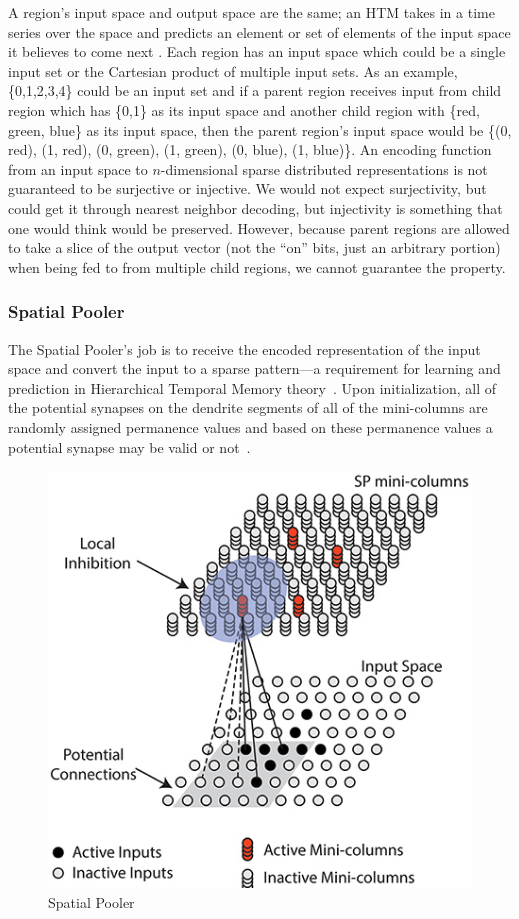 \documentclass[oneside,12pt,openany]{book}
\begin{document}
	A region's input space and output space are the same; an HTM takes in a time series over the space and predicts an element or set of elements of the input space it believes to come next \cite{Purdy}. Each region has an input space which could be a single input set or the Cartesian product of multiple input sets. As an example, \{0,1,2,3,4\} could be an input set and if a parent region receives input from child region which has \{0,1\} as its input space and another child region with \{red, green, blue\} as its input space, then the parent region's input space would be \{(0, red), (1, red), (0, green), (1, green), (0, blue), (1, blue)\}. An encoding function from an input space to $n$-dimensional sparse distributed representations is not guaranteed to be surjective or injective. We would not expect surjectivity, but could get it through nearest neighbor decoding, but injectivity is something that one would think would be preserved. However, because parent regions are allowed to take a slice of the output vector (not the ``on'' bits, just an arbitrary portion) when being fed to from multiple child regions, we cannot guarantee the property.
	
	\subsubsection{Spatial Pooler}

	The Spatial Pooler's job is to receive the encoded representation of the input space and convert the input to a sparse pattern---a requirement for learning and prediction in Hierarchical Temporal Memory theory~\cite{Whitepaper}. Upon initialization, all of the potential synapses on the dendrite segments of all of the mini-columns are randomly assigned permanence values and based on these permanence values a potential synapse may be valid or not~\cite{Whitepaper}. 

	\begin{figure}[!ht]
		\centering
		\includegraphics[width=.6\linewidth]{images/SpatialPooler.jpg}
		\caption[Spatial Pooler]{Spatial Pooler \cite{TheHTMSpatialPooler}}
		\label{fig:SpatialPooler}
	\end{figure}
\end{document}
